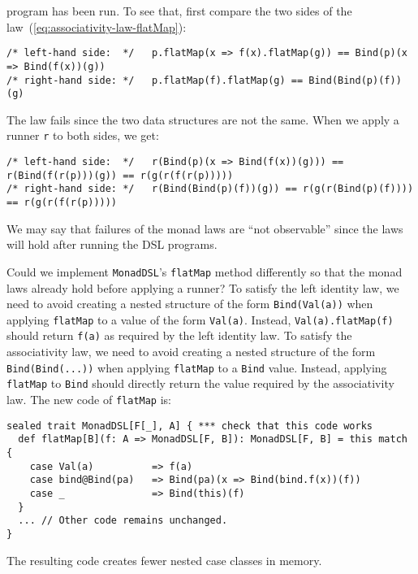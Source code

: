 program has been run. To see that, first compare the two sides of
the law~(\ref{eq:associativity-law-flatMap}):
\begin{lstlisting}
/* left-hand side:  */   p.flatMap(x => f(x).flatMap(g)) == Bind(p)(x => Bind(f(x))(g))
/* right-hand side: */   p.flatMap(f).flatMap(g) == Bind(Bind(p)(f))(g)
\end{lstlisting}
The law fails since the two data structures are not the same. When
we apply a runner \lstinline!r!
to both sides, we get:
\begin{lstlisting}
/* left-hand side:  */   r(Bind(p)(x => Bind(f(x))(g))) == r(Bind(f(r(p)))(g)) == r(g(r(f(r(p)))))  
/* right-hand side: */   r(Bind(Bind(p)(f))(g)) == r(g(r(Bind(p)(f)))) == r(g(r(f(r(p)))))
\end{lstlisting}
We may say that failures of the monad laws are \textsf{``}not observable\textsf{''}
since the laws will hold after running the DSL programs.

Could we implement \lstinline!MonadDSL!\textsf{'}s
\lstinline!flatMap! method
differently so that the monad laws already hold before applying a
runner? To satisfy the left identity law, we need to avoid creating
a nested structure of the form \lstinline!Bind(Val(a))!
when applying \lstinline!flatMap!
to a value of the form \lstinline!Val(a)!.
Instead, \lstinline!Val(a).flatMap(f)!
should return \lstinline!f(a)!
as required by the left identity law. To satisfy the associativity
law, we need to avoid creating a nested structure of the form \lstinline!Bind(Bind(...))!
when applying \lstinline!flatMap!
to a \lstinline!Bind! value.
Instead, applying \lstinline!flatMap!
to \lstinline!Bind! should
directly return the value required by the associativity law. The new
code of \lstinline!flatMap!
is:
\begin{lstlisting}
sealed trait MonadDSL[F[_], A] { *** check that this code works
  def flatMap[B](f: A => MonadDSL[F, B]): MonadDSL[F, B] = this match {
    case Val(a)          => f(a)
    case bind@Bind(pa)   => Bind(pa)(x => Bind(bind.f(x))(f))
    case _               => Bind(this)(f)
  }
  ... // Other code remains unchanged.
}
\end{lstlisting}
The resulting code creates fewer nested case classes in memory.

